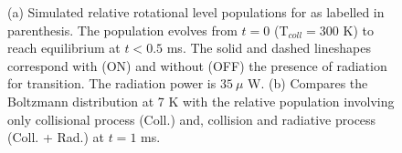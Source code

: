 \begin{figure}[!htb]
    \hfill
    
    \caption{(a) Simulated relative rotational level populations for \CD as labelled in parenthesis. The population evolves from $t=0$ (T$_{coll}=300$ K) to reach equilibrium at $t<0.5$ ms. The solid and dashed lineshapes correspond with (ON) and without (OFF) the presence of radiation for \CD \CDline transition. The radiation power is $35\ \mu$ W. (b) Compares the Boltzmann distribution at 7 K with the relative population involving only collisional process (Coll.) and, collision and radiative process (Coll. + Rad.) at $t=1$ ms.}
    \label{fig:ROSAA-sim-coll-rad-population-boltzmann}
\end{figure}
